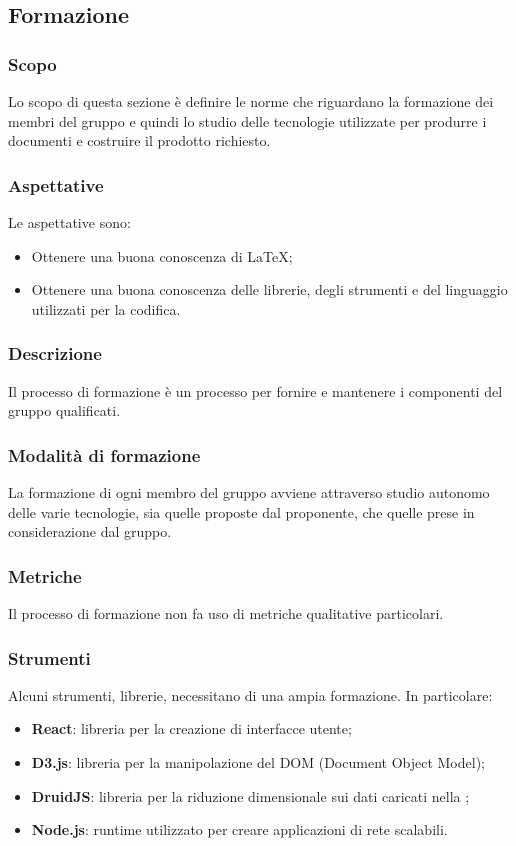 \subsection{Formazione}

\subsubsection{Scopo}
Lo scopo di questa sezione è definire le norme che riguardano la formazione dei membri del gruppo e quindi lo studio delle tecnologie utilizzate per produrre i documenti e costruire il prodotto richiesto. 

\subsubsection{Aspettative}
Le aspettative sono:
\begin{itemize}
	\item Ottenere una buona conoscenza di \LaTeX{};
	\item Ottenere una buona conoscenza delle librerie, degli strumenti e del linguaggio utilizzati per la codifica.
\end{itemize}

\subsubsection{Descrizione}
Il processo di formazione è un processo per fornire e mantenere i componenti del gruppo qualificati.

\subsubsection{Modalità di formazione}
La formazione di ogni membro del gruppo avviene attraverso studio autonomo delle varie tecnologie, sia quelle proposte dal proponente, che quelle prese in considerazione dal gruppo. 

\subsubsection{Metriche}
Il processo di formazione non fa uso di metriche qualitative particolari. 

\subsubsection{Strumenti}
Alcuni strumenti, librerie,  necessitano di una ampia formazione. In particolare:
\begin{itemize}
	\item \textbf{React}: libreria  per la creazione di interfacce utente;
	\item \textbf{D3.js}: libreria per la manipolazione del DOM (Document Object Model);
	\item \textbf{DruidJS}: libreria per la riduzione dimensionale sui dati caricati nella ;
	\item \textbf{Node.js}: runtime  utilizzato per creare applicazioni di rete scalabili.
\end{itemize}